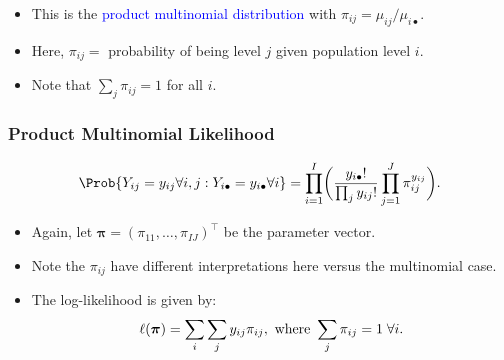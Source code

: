 \documentclass[oneside]{book}\usepackage[]{graphicx}\usepackage[svgnames]{xcolor}
\providecommand\given{} %
\renewcommand\given{\nonscript\:\delimsize\vert\nonscript\:\mathopen{}}%
\renewcommand\given{\nonscript\:\delimsize\vert\nonscript\:\mathopen{}}%
\renewcommand\given{\nonscript\:\delimsize\vert\nonscript\:\mathopen{}}%
\renewcommand\given{\nonscript\:\delimsize\vert\nonscript\:\mathopen{}}%
\renewcommand\given{\nonscript\:\delimsize\vert\nonscript\:\mathopen{}}%
\renewcommand\given{\nonscript\:\delimsize\vert\nonscript\:\mathopen{}}%
\renewcommand\given{\nonscript\:\delimsize\vert\nonscript\:\mathopen{}}%
\renewcommand\given{\nonscript\:\delimsize\vert\nonscript\:\mathopen{}}%
\renewcommand\given{\nonscript\:\delimsize\vert\nonscript\:\mathopen{}}%
\renewcommand\given{\nonscript\:\delimsize\vert\nonscript\:\mathopen{}}%
\renewcommand\given{\nonscript\:\delimsize\vert\nonscript\:\mathopen{}}%
\renewcommand\given{\nonscript\:\delimsize\vert\nonscript\:\mathopen{}}%
\let\log\relax%
\renewcommand\given{:}
\providecommand{\Vector}[1]{\bm{#1}}%
\begin{document}
\begin{itemize}
    \item This is the \textcolor{Blue}{product multinomial distribution} with $ \pi_{ij}=\mu_{ij}/\mu_{i\bullet} $.
    \item Here, $ \pi_{ij}= $ probability of being level $j$ given population level $i$.
    \item Note that $ \sum_j \pi_{ij}=1 $ for all $ i $.
\end{itemize}
\subsubsection*{Product Multinomial Likelihood}
\[ \Prob{Y_{ij}=y_{ij}\forall i,j\given Y_{i\bullet}=y_{i\bullet}\forall i}=
    \prod_{i=1}^I\biggl(\frac{y_{i\bullet}!}{\prod_j y_{ij}!}\prod_{j=1}^J \pi_{ij}^{y_{ij}}\biggr). \]
\begin{itemize}
    \item Again, let $ \Vector{\pi}=(\pi_{11},\ldots,\pi_{IJ})^\top $ be the parameter vector.
    \item Note the $ \pi_{ij} $ have different interpretations here versus the multinomial case.
    \item The log-likelihood is given by:
          \[ \ell(\Vector{\pi})=\sum_i\sum_j y_{ij}\log{\pi_{ij}},\text{ where }\sum_j \pi_{ij}=1\;\forall i. \]
\end{itemize}
\end{document}
